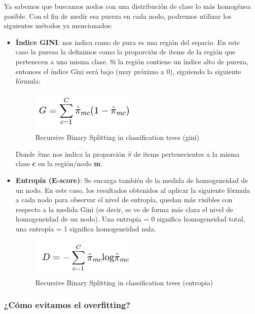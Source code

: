Ya sabemos que buscamos nodos con una distribución de clase lo más homogénea posible. Con el fin de medir esa pureza en cada nodo, podremos utilizar los siguientes métodos ya mencionados:
\begin{itemize}
	\item \textbf{Índice GINI}: nos indica como de pura es una región del espacio. En este caso la pureza la definimos como la proporción de items de la región que pertenecen a una misma clase. Si la región contiene un índice
	alto de pureza, entonces el índice Gini será bajo (muy próximo a 0), siguiendo la siguiente fórmula:
	\begin{figure}[H]
		\centering
		\includegraphics[width=0.5\textwidth]{imagenes/gini} 
		\caption{Recursive Binary Splitting in classification trees (gini) \cite{ref8}}
	\end{figure}
	Donde $\widehat{\pi}$mc nos indica la proporción \textbf{$\widehat{\pi}$} de items pertenecientes a la misma clase \textbf{c} en la región/nodo \textbf{m}.
	\item \textbf{Entropía (E-score)}: Se encarga también de la medida de homogeneidad de un nodo. En este caso, los resultados obtenidos al aplicar la siguiente fórmula a cada nodo para observar el nivel de entropía, quedan más visibles con respecto a la medida Gini (es decir, se ve de forma más clara el nivel de homogeneidad de un nodo). Una entropía = 0 significa homogeneidad total, una entropía = 1 significa homogeneidad nula.
	\begin{figure}[H]
		\centering
		\includegraphics[width=0.5\textwidth]{imagenes/entropia} 
		\caption{Recursive Binary Splitting in classification trees (entropia) \cite{ref8}}
	\end{figure}
\end{itemize}

\subsubsection{¿Cómo evitamos el overfitting?}

